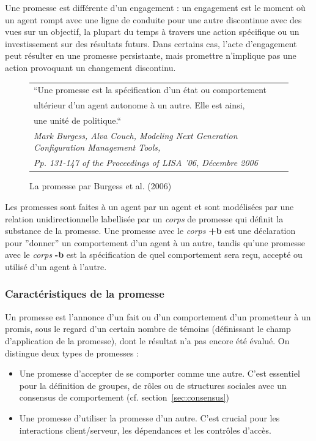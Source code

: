 Une promesse est différente d'un engagement : un engagement est le moment où un
agent rompt avec une ligne de conduite pour une autre discontinue avec des vues
sur un objectif, la plupart du temps à travers une action spécifique ou un
investissement sur des résultats futurs. Dans certains cas, l'acte
d'engagement peut résulter en une promesse persistante, mais promettre
n'implique pas une action provoquant un changement discontinu.

\begin{figure}[H]
    \centering
    \begin{tabular}{l}
        ``Une promesse est la spécification d'un état ou comportement \\
        ultérieur d'un agent autonome à un autre. Elle est ainsi, \\
        une unité de politique.`` \cite{burgess_modeling_2006} \\
        \em \footnotesize Mark Burgess, Alva Couch, Modeling Next Generation
        Configuration Management Tools, \\
        \em \footnotesize Pp. 131-147 of the Proceedings of LISA '06,
        Décembre 2006
    \end{tabular}
    \caption{La promesse par Burgess et al. (2006)}
    \label{fig:quote}
\end{figure}

Les promesses sont faites à un agent par un agent et sont modélisées par une
relation unidirectionnelle labellisée par un \emph{corps} de promesse qui
définit la substance de la promesse. Une promesse avec le \emph{corps}
\textbf{+b} est une déclaration pour ''donner'' un comportement d'un agent à un
autre, tandis qu'une promesse avec le \emph{corps} \textbf{-b} est la
spécification de quel comportement sera reçu, accepté ou utilisé d'un agent à
l'autre.

\subsubsection{Caractéristiques de la promesse}

Un promesse est l'annonce d'un fait ou d'un comportement d'un prometteur à un
promis, sous le regard d'un certain nombre de témoins (définissant le champ
d'application de la promesse), dont le résultat n'a pas encore été évalué.  On
distingue deux types de promesses :

\begin{itemize}
    \item Une promesse d'accepter de se comporter comme une autre. C'est
        essentiel pour la définition de groupes, de rôles ou de structures
        sociales avec un consensus de comportement (cf.
        section~\ref{sec:consensus})
    \item Une promesse d'utiliser la promesse d'un autre. C'est crucial pour les
        interactions client/serveur, les dépendances et les contrôles d'accès.
\end{itemize}

